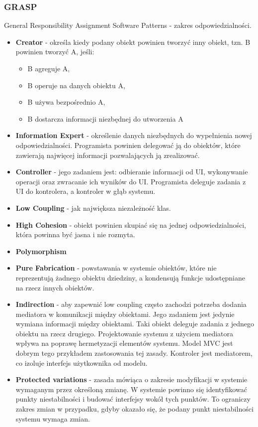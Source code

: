 \documentclass[../main.tex]{subfiles}
\begin{document}
    \subsubsection{GRASP}
    General Responsibility Assignment Software Patterns - zakres odpowiedzialności.
    \begin{itemize}
        \item \textbf{Creator} - określa kiedy podany obiekt powinien tworzyć inny obiekt, tzn. B powinien tworzyć A, jeśli:
        \begin{itemize}
            \item B agreguje A,
            \item B operuje na danych obiektu A,
            \item B używa bezpośrednio A,
            \item B dostarcza informacji niezbędnej do utworzenia A
        \end{itemize}
        \item \textbf{Information Expert} - określenie danych niezbędnych do wypełnienia nowej odpowiedzialności. Programista powinien delegować ją do obiektów, które
        zawierają najwięcej informacji pozwalających ją zrealizować.
        \item \textbf{Controller} - jego zadaniem jest: odbieranie informacji od UI, wykonywanie operacji oraz zwracanie ich wyników do UI.
        Programista deleguje zadania z UI do kontrolera, a kontroler w głąb systemu.
        \item \textbf{Low Coupling} - jak największa niezależność klas.
        \item \textbf{High Cohesion} - obiekt powinien skupiać się na jednej odpowiedzialności, która powinna być jasna i nie rozmyta.
        \item \textbf{Polymorphism}
        \item \textbf{Pure Fabrication} - powstawania w systemie obiektów, które nie reprezentują
        żadnego obiektu dziedziny, a kondensują funkcje udostępniane na rzecz innych obiektów.
        \item \textbf{Indirection} - aby zapewnić low coupling często zachodzi potrzeba
        dodania mediatora w komunikacji między obiektami. Jego zadaniem jest jedynie wymiana informacji
        między obiektami. Taki obiekt deleguje zadania z jednego obiektu na rzecz drugiego. Projektowanie
        systemu z użyciem mediatora wpływa na poprawę hermetyzacji elementów systemu.
        Model MVC jest dobrym tego przykładem zastosowania tej zasady. Kontroler jest mediatorem, co izoluje
        interfejs użytkownika od modelu.
        \item \textbf{Protected variations} - zasada mówiąca o zakresie modyfikacji w systemie
        wymaganym przez określoną zmianę. W systemie powinno się identyfikować punkty niestabilności i
        budować interfejsy wokół tych punktów. To ograniczy zakres zmian w przypadku, gdyby
        okazało się, że podany punkt niestabilności systemu wymaga zmian.
    \end{itemize}
\end{document}
